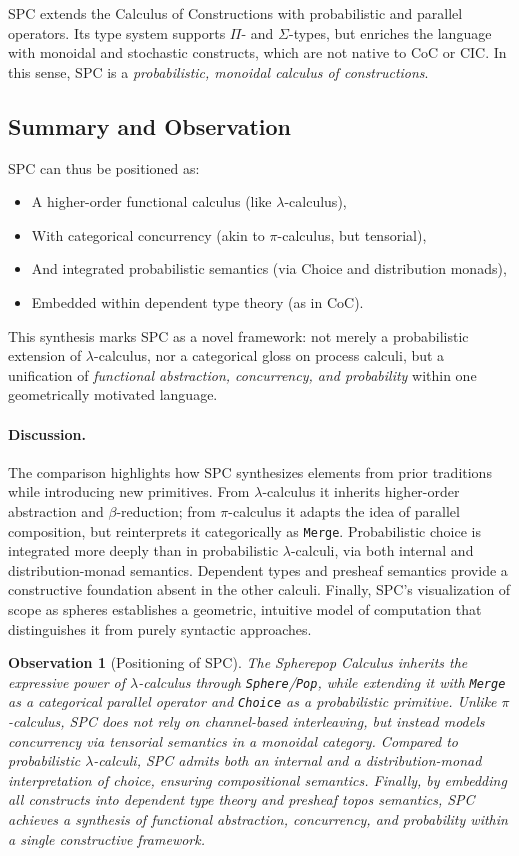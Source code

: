 \documentclass{article}
\newtheorem{observation}[theorem]{Observation}
\begin{document}
SPC extends the Calculus of Constructions with probabilistic and parallel
operators. Its type system supports $\Pi$- and $\Sigma$-types, but enriches
the language with monoidal and stochastic constructs, which are not native to
CoC or CIC. In this sense, SPC is a \emph{probabilistic, monoidal calculus of
constructions}.

\subsection{Summary and Observation}

SPC can thus be positioned as:
\begin{itemize}
  \item A higher-order functional calculus (like $\lambda$-calculus),
  \item With categorical concurrency (akin to $\pi$-calculus, but tensorial),
  \item And integrated probabilistic semantics (via Choice and distribution monads),
  \item Embedded within dependent type theory (as in CoC).
\end{itemize}
This synthesis marks SPC as a novel framework: not merely a probabilistic
extension of $\lambda$-calculus, nor a categorical gloss on process calculi,
but a unification of \emph{functional abstraction, concurrency, and
probability} within one geometrically motivated language.

\paragraph{Discussion.}
The comparison highlights how SPC synthesizes elements from prior traditions while
introducing new primitives. From $\lambda$-calculus it inherits higher-order
abstraction and $\beta$-reduction; from $\pi$-calculus it adapts the idea of
parallel composition, but reinterprets it categorically as \texttt{Merge}.
Probabilistic choice is integrated more deeply than in probabilistic $\lambda$-calculi,
via both internal and distribution-monad semantics. Dependent types and presheaf
semantics provide a constructive foundation absent in the other calculi. Finally,
SPC’s visualization of scope as spheres establishes a geometric, intuitive model of
computation that distinguishes it from purely syntactic approaches.

\begin{observation}[Positioning of SPC]
The Spherepop Calculus inherits the expressive power of $\lambda$-calculus through
\texttt{Sphere}/\texttt{Pop}, while extending it with \texttt{Merge} as a categorical
parallel operator and \texttt{Choice} as a probabilistic primitive.
Unlike $\pi$-calculus, SPC does not rely on channel-based interleaving, but instead
models concurrency via tensorial semantics in a monoidal category.
Compared to probabilistic $\lambda$-calculi, SPC admits both an internal and a
distribution-monad interpretation of choice, ensuring compositional semantics.
Finally, by embedding all constructs into dependent type theory and presheaf topos
semantics, SPC achieves a synthesis of functional abstraction, concurrency, and
probability within a single constructive framework.
\end{observation}
\end{document}
